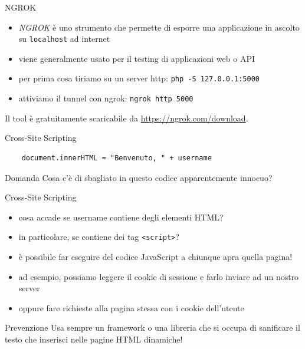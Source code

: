 \documentclass[12pt]{beamer}
\begin{document}
\begin{frame}{NGROK}
    \begin{itemize}
        \item \textit{NGROK} è uno strumento che permette di esporre una applicazione in ascolto su \texttt{localhost} ad internet
        \item viene generalmente usato per il testing di applicazioni web o API
        \item per prima cosa tiriamo su un server http: \texttt{php -S 127.0.0.1:5000}
        \item attiviamo il tunnel con ngrok: \texttt{ngrok http 5000}
    \end{itemize}
    \vfill
    Il tool è gratuitamente scaricabile da 
    \url{https://ngrok.com/download}.
\end{frame}

\begin{frame}[fragile]{Cross-Site Scripting}
\begin{verbatim}
    document.innerHTML = "Benvenuto, " + username
\end{verbatim}
\vfill
\begin{exampleblock}{Domanda}
Cosa c'è di sbagliato in questo codice apparentemente innocuo?
\end{exampleblock}
\end{frame}

\begin{frame}{Cross-Site Scripting}
\begin{itemize}
\item cosa accade se username contiene degli elementi HTML?
\pause
\item in particolare, se contiene dei tag \texttt{<script>}?
\pause
\item è possibile far eseguire del codice JavaScript a chiunque apra quella pagina!
\pause
\item ad esempio, possiamo leggere il cookie di sessione e farlo inviare ad un nostro server
\pause
\item oppure fare richieste alla pagina stessa con i cookie dell'utente
\end{itemize}
\pause
\vfill
\begin{alertblock}{Prevenzione}
Usa sempre un framework o una libreria che si occupa di sanificare il testo che inserisci nelle pagine HTML dinamiche!
\end{alertblock}
\end{frame}
\end{document}
